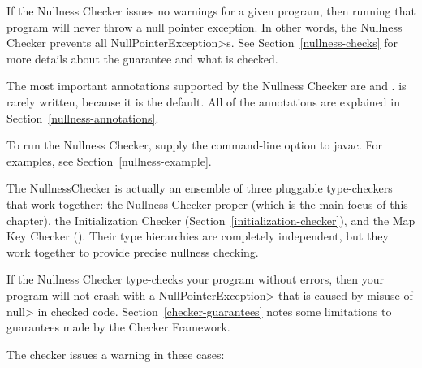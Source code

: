 \htmlhr
{}

If the Nullness Checker issues no warnings for a given program, then
running that program will never throw a null pointer exception.  In
other words, the Nullness Checker prevents all \<NullPointerException>s.
See Section~\ref{nullness-checks} for more details about
the guarantee and what is checked.

The most important annotations supported by the Nullness Checker are
 and
.
 is rarely written, because it is
the default.  All of the annotations are explained in
Section~\ref{nullness-annotations}.

To run the Nullness Checker, supply the
command-line option to javac.  For
examples, see Section~\ref{nullness-example}.

The NullnessChecker is actually an ensemble of three pluggable
type-checkers that work together: the Nullness Checker proper (which is the
main focus of this chapter), the Initialization Checker
(Section~\ref{initialization-checker}), and the Map Key Checker
().
Their type hierarchies are completely independent, but they work together
to provide precise nullness checking.




If the Nullness Checker type-checks your program without errors, then your
program will not crash with a \<NullPointerException> that is caused by
misuse of \<null> in checked code.
%
Section~\ref{checker-guarantees} notes some limitations to guarantees made
by the Checker Framework.

The checker issues a warning in these cases:


